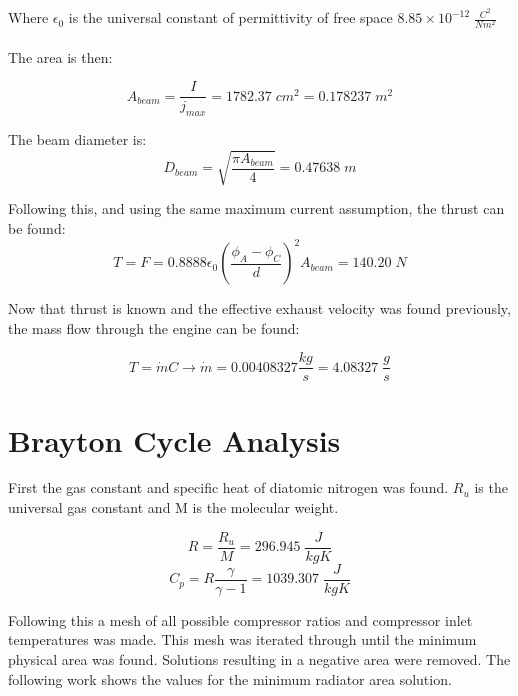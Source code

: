\documentclass[journal ]{new-aiaa}
\begin{document}
\noindent Where $\epsilon_0$ is the universal constant of permittivity of free space $8.85\times10^{-12} \; \frac{C^2}{N m^2}$
\\
\\\noindent The area is then:

\begin{equation}
    A_{beam} = \frac{I}{j_{max}} = 1782.37\;cm^2 = 0.178237\;m^2
\end{equation}

\noindent The beam diameter is:
\begin{equation*}
    D_{beam} = \sqrt{\frac{\pi A_{beam}}{4}} = \boxed{0.47638\;m} 
\end{equation*}

\noindent Following this, and using the same maximum current assumption, the thrust can be found:
\begin{equation}
    T = F = 0.8888 \epsilon_0 \left(\frac{\phi_A - \phi_C}{d}\right)^2 A_{beam}
    = \boxed{140.20\;N}
\end{equation}

Now that thrust is known and the effective exhaust velocity was found previously, the mass flow through the engine can be found:

\begin{equation}
    T = \dot{m} C \rightarrow \dot{m} =\boxed{0.00408327 \frac{kg}{s}=4.08327\; \frac{g}{s}} 
\end{equation}

\section{Brayton Cycle Analysis}

First the gas constant and specific heat of diatomic nitrogen was found. 
$R_u$ is the universal gas constant and M is the molecular weight.

\begin{equation}
    R = \frac{R_u}{M} = 296.945\;\frac{J}{kgK}
\end{equation}
\begin{equation}
    C_p = R \frac{\gamma}{\gamma-1} = 1039.307\;\frac{J}{kgK} 
\end{equation}

Following this a mesh of all possible compressor ratios and compressor inlet temperatures was made.
This mesh was iterated through until the minimum physical area was found. Solutions resulting in a negative area were removed.
The following work shows the values for the minimum radiator area solution.
\end{document}
